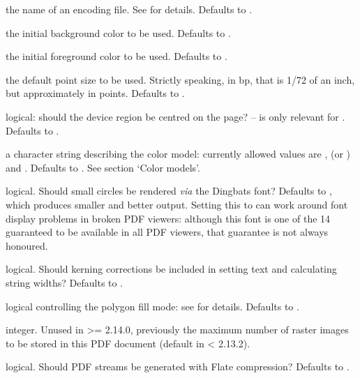 \begin{Arguments}
\begin{ldescription}
\item[\code{encoding}] the name of an encoding file.  See
 for details.  Defaults to .
\item[\code{bg}] the initial background color to be used.  Defaults to
.
\item[\code{fg}] the initial foreground color to be used.  Defaults to
.
\item[\code{pointsize}] the default point size to be used.  Strictly
speaking, in bp, that is 1/72 of an inch, but approximately in
points.  Defaults to .
\item[\code{pagecentre}] logical: should the device region be centred on the
page? -- is only relevant for .  
Defaults to .
\item[\code{colormodel}] a character string describing the color model:
currently allowed values are ,  (or
) and .  Defaults to .  See section
`Color models'.
\item[\code{useDingbats}] logical.  Should small circles be rendered
\emph{via} the Dingbats font?  Defaults to , which produces
smaller and better output.  Setting this to  can work
around font display problems in broken PDF viewers: although this
font is one of the 14 guaranteed to be available in all PDF viewers,
that guarantee is not always honoured.

\item[\code{useKerning}] logical.  Should kerning corrections be included in
setting text and calculating string widths?  Defaults to .
\item[\code{fillOddEven}] logical controlling the polygon fill mode:  see
 for details.  Defaults to .
\item[\code{maxRasters}] integer.  Unused in \R{} >= 2.14.0, previously the
maximum number of raster images to be stored in this PDF document
(default  in \R{} < 2.13.2).
\item[\code{compress}] logical.  Should PDF streams be generated with Flate
compression?  Defaults to .
\end{ldescription}
\end{Arguments}
%
